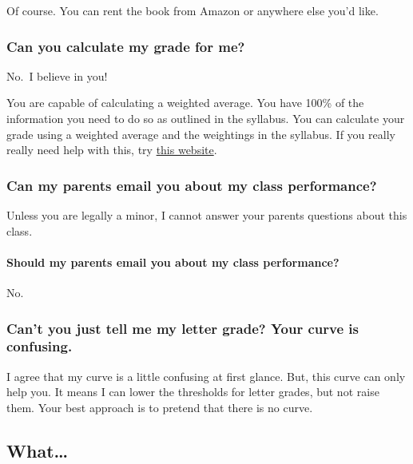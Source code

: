 Of course. You can rent the book from Amazon or anywhere else you'd like.

\hypertarget{can-you-calculate-my-grade-for-me}{%
\subsubsection{Can you calculate my grade for me?}\label{can-you-calculate-my-grade-for-me}}

No.~I believe in you!

You are capable of calculating a weighted average.
You have 100\% of the information you need to do so as outlined in the syllabus.
You can calculate your grade using a weighted average and the weightings in the syllabus.
If you really really need help with this, try \href{https://thegradecalculator.com/}{this website}.

\hypertarget{can-my-parents-email-you-about-my-class-performance}{%
\subsubsection{Can my parents email you about my class performance?}\label{can-my-parents-email-you-about-my-class-performance}}

Unless you are legally a minor, I cannot answer your parents questions about this class.

\hypertarget{should-my-parents-email-you-about-my-class-performance}{%
\paragraph{Should my parents email you about my class performance?}\label{should-my-parents-email-you-about-my-class-performance}}

No.

\hypertarget{cant-you-just-tell-me-my-letter-grade-your-curve-is-confusing.}{%
\subsubsection{Can't you just tell me my letter grade? Your curve is confusing.}\label{cant-you-just-tell-me-my-letter-grade-your-curve-is-confusing.}}

I agree that my curve is a little confusing at first glance.
But, this curve can only help you. It means I can lower the thresholds for letter grades, but not raise them.
Your best approach is to pretend that there is no curve.

\hypertarget{what}{%
\subsection{What\ldots{}}\label{what}}

